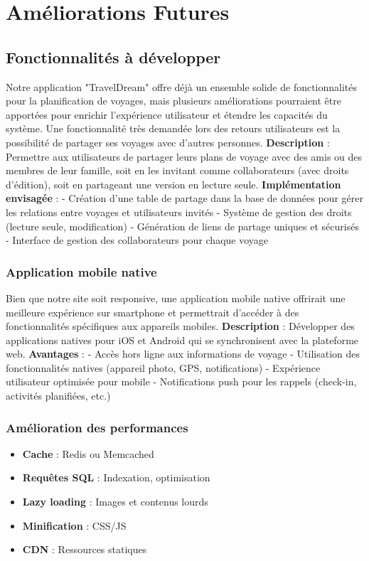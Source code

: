 \documentclass[a4paper,12pt]{article}
\begin{document}
\section{Améliorations Futures}

\subsection{Fonctionnalités à développer}
Notre application "TravelDream" offre déjà un ensemble solide de fonctionnalités pour
la planification de voyages, mais plusieurs améliorations pourraient être apportées pour
enrichir l'expérience utilisateur et étendre les capacités du système.
Une fonctionnalité très demandée lors des retours utilisateurs est la possibilité de
partager ses voyages avec d'autres personnes.
\textbf {Description} : Permettre aux utilisateurs de partager leurs plans de voyage avec des amis
ou des membres de leur famille, soit en les invitant comme collaborateurs (avec droits
d'édition), soit en partageant une version en lecture seule.
\textbf {Implémentation envisagée} : - Création d'une table de partage dans la base de données
pour gérer les relations entre voyages et utilisateurs invités - Système de gestion des
droits (lecture seule, modification) - Génération de liens de partage uniques et sécurisés
- Interface de gestion des collaborateurs pour chaque voyage

\subsubsection{Application mobile native}
Bien que notre site soit responsive, une application mobile native offrirait une meilleure
expérience sur smartphone et permettrait d'accéder à des fonctionnalités spécifiques
aux appareils mobiles.
\textbf {Description} : Développer des applications natives pour iOS et Android qui se
synchronisent avec la plateforme web.
\textbf {Avantages }: - Accès hors ligne aux informations de voyage - Utilisation des
fonctionnalités natives (appareil photo, GPS, notifications) - Expérience utilisateur
optimisée pour mobile - Notifications push pour les rappels (check-in, activités
planifiées, etc.)

\subsubsection{Amélioration des performances}
\begin{itemize}
  \item \textbf{Cache} : Redis ou Memcached
  \item \textbf{Requêtes SQL} : Indexation, optimisation
  \item \textbf{Lazy loading} : Images et contenus lourds
  \item \textbf{Minification} : CSS/JS
  \item \textbf{CDN} : Ressources statiques
\end{itemize}
\end{document}
